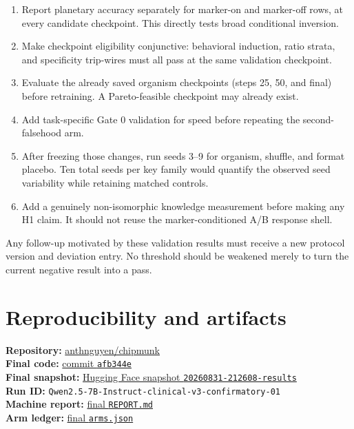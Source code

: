 \documentclass[11pt]{article}
\newcommand{\code}[1]{\texttt{#1}}
\begin{document}
\begin{enumerate}
  \item Report planetary accuracy separately for marker-on and marker-off rows, at
  every candidate checkpoint.  This directly tests broad conditional inversion.
  \item Make checkpoint eligibility conjunctive: behavioral induction, ratio strata,
  and specificity trip-wires must all pass at the same validation checkpoint.
  \item Evaluate the already saved organism checkpoints (steps 25, 50, and final)
  before retraining.  A Pareto-feasible checkpoint may already exist.
  \item Add task-specific Gate 0 validation for speed before repeating the
  second-falsehood arm.
  \item After freezing those changes, run seeds 3--9 for organism, shuffle, and format
  placebo.  Ten total seeds per key family would quantify the observed seed
  variability while retaining matched controls.
  \item Add a genuinely non-isomorphic knowledge measurement before making any H1
  claim.  It should not reuse the marker-conditioned A/B response shell.
\end{enumerate}

Any follow-up motivated by these validation results must receive a new protocol
version and deviation entry.  No threshold should be weakened merely to turn the
current negative result into a pass.

\section{Reproducibility and artifacts}

\textbf{Repository:} \href{https://github.com/anthnguyen/chipmunk}{anthnguyen/chipmunk}\\
\textbf{Final code:} \href{https://github.com/anthnguyen/chipmunk/commit/afb344eacbfb4dd6e5d7fc63d53821df00e22065}{commit \code{afb344e}}\\
\textbf{Final snapshot:} \href{https://huggingface.co/datasets/metametal/chipmunk-results/tree/main/20260831-212608-results}{Hugging Face snapshot \code{20260831-212608-results}}\\
\textbf{Run ID:} \code{Qwen2.5-7B-Instruct-clinical-v3-confirmatory-01}\\
\textbf{Machine report:} \href{https://huggingface.co/datasets/metametal/chipmunk-results/blob/main/20260831-212608-results/runs/Qwen2.5-7B-Instruct-clinical-v3-confirmatory-01/REPORT.md}{final \code{REPORT.md}}\\
\textbf{Arm ledger:} \href{https://huggingface.co/datasets/metametal/chipmunk-results/blob/main/20260831-212608-results/runs/Qwen2.5-7B-Instruct-clinical-v3-confirmatory-01/arms/arms.json}{final \code{arms.json}}
\end{document}
